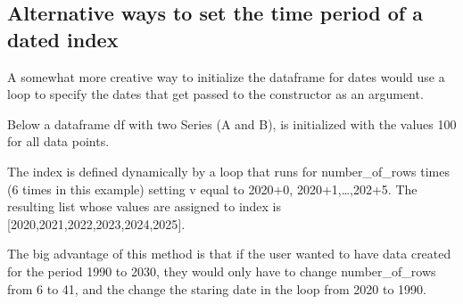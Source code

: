 \documentclass[letterpaper,10pt,english]{jupyterBook}
\begin{document}
\subsection{Alternative ways to set the time period of a dated index}
\label{\detokenize{content/04_PythonEssentials/PythonPandasDataframes:alternative-ways-to-set-the-time-period-of-a-dated-index}}
\sphinxAtStartPar
A somewhat more creative way to initialize the dataframe for dates would use a loop to specify the dates that get passed to the constructor as an argument.

\sphinxAtStartPar
Below a dataframe df with two Series (A and B), is initialized with the values 100 for all data points.

\sphinxAtStartPar
The index is defined dynamically by a loop  that runs for number\_of\_rows times (6 times in this example) setting v equal to 2020+0, 2020+1,…,202+5. The resulting list whose values are assigned to index is {[}2020,2021,2022,2023,2024,2025{]}.

\sphinxAtStartPar
The big advantage of this method is that if the user wanted to have data created for the period 1990 to 2030, they would only have to change number\_of\_rows from 6 to 41, and the change the staring date in the loop from 2020 to 1990.
\end{document}
